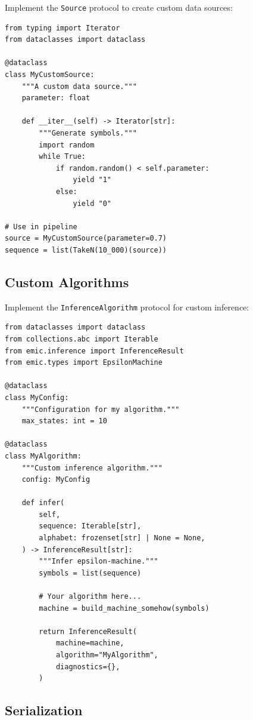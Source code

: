 \documentclass[11pt,a4paper]{report}
\theoremstyle{definition}
\theoremstyle{plain}
\begin{document}
Implement the \texttt{Source} protocol to create custom data sources:

\begin{lstlisting}[caption={Custom source implementation}]
from typing import Iterator
from dataclasses import dataclass

@dataclass
class MyCustomSource:
    """A custom data source."""
    parameter: float

    def __iter__(self) -> Iterator[str]:
        """Generate symbols."""
        import random
        while True:
            if random.random() < self.parameter:
                yield "1"
            else:
                yield "0"

# Use in pipeline
source = MyCustomSource(parameter=0.7)
sequence = list(TakeN(10_000)(source))
\end{lstlisting}

\subsection{Custom Algorithms}

Implement the \texttt{InferenceAlgorithm} protocol for custom inference:

\begin{lstlisting}[caption={Custom algorithm skeleton}]
from dataclasses import dataclass
from collections.abc import Iterable
from emic.inference import InferenceResult
from emic.types import EpsilonMachine

@dataclass
class MyConfig:
    """Configuration for my algorithm."""
    max_states: int = 10

@dataclass
class MyAlgorithm:
    """Custom inference algorithm."""
    config: MyConfig

    def infer(
        self,
        sequence: Iterable[str],
        alphabet: frozenset[str] | None = None,
    ) -> InferenceResult[str]:
        """Infer epsilon-machine."""
        symbols = list(sequence)

        # Your algorithm here...
        machine = build_machine_somehow(symbols)

        return InferenceResult(
            machine=machine,
            algorithm="MyAlgorithm",
            diagnostics={},
        )
\end{lstlisting}

\subsection{Serialization}
\end{document}
